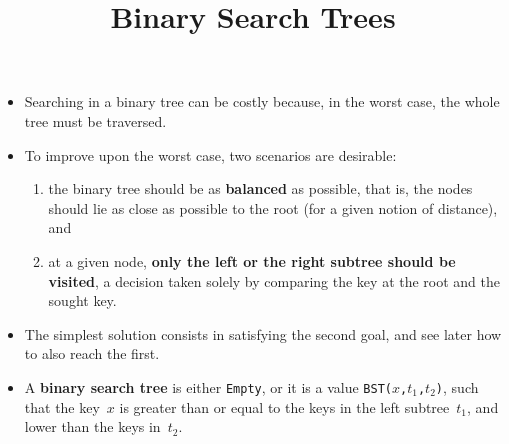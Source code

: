 \documentclass[wide]{slides}
\begin{document}
\begin{slide}
  \label{slide:balanced}
  \title{Binary Search Trees}

  \begin{itemize}

    \item Searching in a binary tree can be costly because, in the
      worst case, the whole tree must be traversed.

    \item To improve upon the worst case, two scenarios are desirable:
      \begin{enumerate}

        \item the binary tree should be as \textbf{balanced} as
          possible, that is, the nodes should lie as close as possible
          to the root (for a given notion of distance), and

        \item at a given node, \textbf{only the left or the right
          subtree should be visited}, a decision taken solely by
          comparing the key at the root and the sought key.

      \end{enumerate}

    \item The simplest solution consists in satisfying the second
      goal, and see later how to also reach the first.

    \item A \textbf{binary search tree} is either \texttt{Empty}, or
      it is a value \texttt{BST($x$,$t_1$,$t_2$)}, such that the
      key~\(x\) is greater than or equal to the keys in the left
      subtree~\(t_1\), and lower than the keys in~\(t_2\).

  \end{itemize}

\end{slide}
\end{document}

